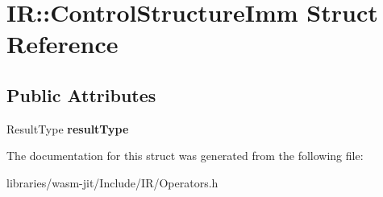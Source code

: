 \hypertarget{struct_i_r_1_1_control_structure_imm}{}\section{IR\+:\+:Control\+Structure\+Imm Struct Reference}
\label{struct_i_r_1_1_control_structure_imm}
\subsection*{Public Attributes}
\begin{DoxyCompactItemize}
\item 
\mbox{\label{struct_i_r_1_1_control_structure_imm_aeb701cf55047144f9cded296519cb742}} 
Result\+Type {\bfseries result\+Type}
\end{DoxyCompactItemize}


The documentation for this struct was generated from the following file\+:\begin{DoxyCompactItemize}
\item 
libraries/wasm-\/jit/\+Include/\+I\+R/Operators.\+h\end{DoxyCompactItemize}
